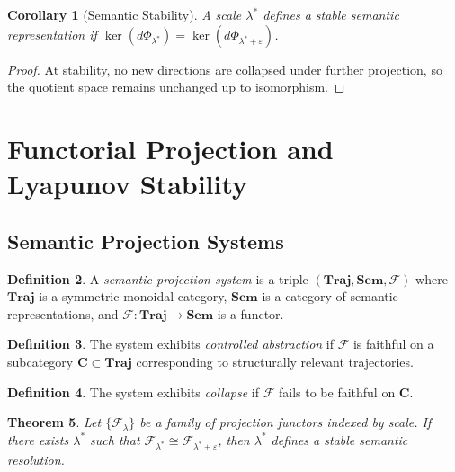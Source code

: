 \documentclass[11pt, twoside]{article}
\theoremstyle{plain}
\newtheorem{theorem}{Theorem}[section]
\newtheorem{corollary}[theorem]{Corollary}
\theoremstyle{definition}
\newtheorem{definition}[theorem]{Definition}
\theoremstyle{remark}
\begin{document}
\begin{corollary}[Semantic Stability]
A scale $\lambda^*$ defines a stable semantic representation if $\ker(d\Phi_{\lambda^*}) = \ker(d\Phi_{\lambda^* + \varepsilon})$.
\end{corollary}

\begin{proof}
At stability, no new directions are collapsed under further projection, so the quotient space remains unchanged up to isomorphism.
\end{proof}

\section{Functorial Projection and Lyapunov Stability}
\label{app:functor_lyapunov}

\subsection{Semantic Projection Systems}

\begin{definition}
A \emph{semantic projection system} is a triple $(\mathbf{Traj}, \mathbf{Sem}, \mathcal{F})$ where $\mathbf{Traj}$ is a symmetric monoidal category, $\mathbf{Sem}$ is a category of semantic representations, and $\mathcal{F} : \mathbf{Traj} \to \mathbf{Sem}$ is a functor.
\end{definition}

\begin{definition}
The system exhibits \emph{controlled abstraction} if $\mathcal{F}$ is faithful on a subcategory $\mathbf{C} \subset \mathbf{Traj}$ corresponding to structurally relevant trajectories.
\end{definition}

\begin{definition}
The system exhibits \emph{collapse} if $\mathcal{F}$ fails to be faithful on $\mathbf{C}$.
\end{definition}

\begin{theorem}
Let $\{\mathcal{F}_\lambda\}$ be a family of projection functors indexed by scale. If there exists $\lambda^*$ such that $\mathcal{F}_{\lambda^*} \cong \mathcal{F}_{\lambda^* + \varepsilon}$, then $\lambda^*$ defines a stable semantic resolution.
\end{theorem}
\end{document}
